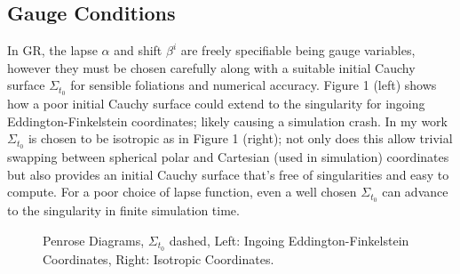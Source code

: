 \subsection{Gauge Conditions}
In GR, the lapse $\alpha$ and shift $\beta^i$ are freely specifiable being gauge variables, however they must be chosen carefully along with a suitable initial Cauchy surface $\Sigma_{t_0}$ for sensible foliations and numerical accuracy. Figure 1 (left) shows how a poor initial Cauchy surface could extend to the singularity for ingoing Eddington-Finkelstein coordinates; likely causing a simulation crash. In my work $\Sigma_{t_0}$ is chosen to be isotropic as in Figure 1 (right); not only does this allow trivial swapping between spherical polar and Cartesian (used in simulation) coordinates but also provides an initial Cauchy surface that's free of singularities and easy to compute. For a poor choice of lapse function, even a well chosen $\Sigma_{t_0}$ can advance to the singularity in finite simulation time.
  \begin{figure}[h]
  \caption{Penrose Diagrams, $\Sigma_{t_0}$ dashed, Left: Ingoing Eddington-Finkelstein Coordinates, Right: Isotropic Coordinates.}
  \centering
  \hfill
\end{figure}

